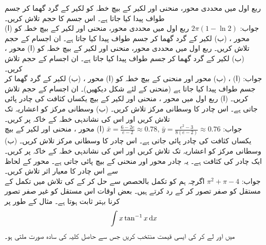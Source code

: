 ربع اول میں محددی محور، منحنی  اور لکیر  کے بیچ خطہ کو لکیر  کے گرد گھما کر جسم طواف پیدا کیا جاتا ہے۔ اس جسم کا حجم تلاش کریں۔\\
جواب:\quad
$2\pi(1-\ln 2)$
ربع اول میں محددی محور، منحنی  اور لکیر  کے بیچ خطہ کو (ا) محور   ، (ب) لکیر  کے گرد گھما کر جسم طواف پیدا کیا جاتا ہے۔ ان اجسام کے حجم تلاش کریں۔
ربع اول میں محددی محور، منحنی  اور لکیر  کے بیچ خطہ کو (ا) محور   ، (ب) لکیر  کے گرد گھما کر جسم طواف پیدا کیا جاتا ہے۔ ان اجسام کے حجم تلاش کریں۔\\
جواب:\quad
(ا) ، (ب) 
محور  اور منحنی   کے بیچ خطہ کو (ا) محور   ، (ب) لکیر  کے گرد گھما کر جسم طواف پیدا کیا جاتا ہے (منحنی کے لئے شکل  دیکھیں)۔ ان اجسام کے حجم تلاش کریں۔
(ا) ربع اول میں محور ، منحنی  اور لکیر  کے بیچ یکساں کثافت کی چادر پائی جاتی ہے۔ اس چادر کا وسطانی مرکز تلاش کریں۔ (ب) وسطانی مرکز کو  اعشاریہ تک تلاش کریں اور اس کی نشاندہی خطہ کے خاکہ پر کریں۔\\
جواب:\quad
$\bar{x}=\tfrac{6-2e}{e-2}\approx 0.78,\,\bar{y}=\tfrac{e^2-3}{8(e-2)}\approx 0.76$
(ا) محور ، منحنی  اور لکیر  کے بیچ یکساں کثافت کی چادر پائی جاتی ہے۔ اس چادر کا وسطانی مرکز تلاش کریں۔ (ب) وسطانی مرکز کو  اعشاریہ تک تلاش کریں اور اس کی نشاندہی خطہ کے خاکہ پر کریں۔
ایک چادر کی کثافت  ہے۔ یہ چادر محور  اور منحنی  کے بیچ پائی جاتی ہے۔ محور  کے لحاظ سے اس چادر کا معیار اثر تلاش کریں۔\\
جواب:\quad
$\pi^2+\pi-4$
اگرچہ ہم  کو تکمل بالحصص سے حل کر کے  کی تلاش میں تکمل کے مستقل کو صفر تصور کر کے رد کرتے ہیں۔ بعض اوقات اس مستقل کو غیر صفر تصور کرنا بہتر ثابت ہوتا ہے۔ مثال کے طور پر
\begin{align*}
\int x\tan^{-1}x\dif x
\end{align*}
میں  اور  لے کر  کی ایسی قیمت منتخب کریں جس سے حاصل کلیہ کی سادہ صورت ملتی ہو۔
